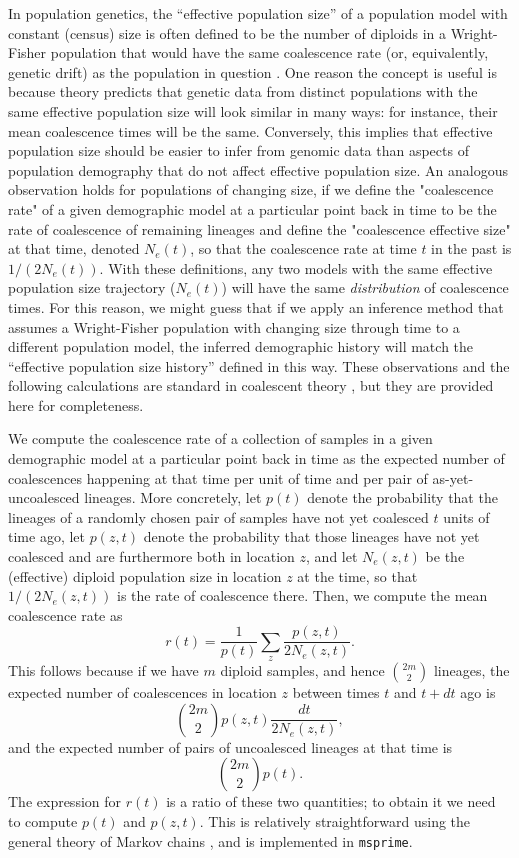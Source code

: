 \documentclass[12pt,halfline,a4paper]{ouparticle}
\begin{document}
In population genetics, the ``effective population size''
of a population model with constant (census) size
is often defined to be the number of diploids in a Wright-Fisher population
that would have the same coalescence rate (or, equivalently, genetic drift)
as the population in question \citep[reviewed in][]{crow1988inbreeding}.
One reason the concept is useful
is because theory predicts that genetic data from distinct populations
with the same effective population size will look similar in many ways:
for instance, their mean coalescence times will be the same.
Conversely, this implies that effective population size
should be easier to infer from genomic data than aspects of population demography
that do not affect effective population size.
An analogous observation holds for populations of changing size,
if we define the "coalescence rate" of a given demographic model
at a particular point back in time
to be the rate of coalescence of remaining lineages
and define the "coalescence effective size" at that time,
denoted $N_e(t)$, so that the coalescence rate at time $t$ in the past
is $1/(2N_e(t))$.
With these definitions, any two models with the same effective population size trajectory ($N_e(t)$)
will have the same \emph{distribution} of coalescence times.
For this reason,
we might guess that if we apply an inference method
that assumes a Wright-Fisher population with changing size through time
to a different population model,
the inferred demographic history will match the ``effective population size history''
defined in this way.
These observations and the following calculations are standard in coalescent theory
\citep[see e.g.,][]{wakeley2005coalescent},
but they are provided here for completeness.

We compute the coalescence rate of a collection of samples in a given demographic model
at a particular point back in time
as the expected number of coalescences happening at that time
per unit of time and per pair of as-yet-uncoalesced lineages.
More concretely,
let $p(t)$ denote the probability that the lineages of a randomly chosen pair of samples
have not yet coalesced $t$ units of time ago,
let $p(z, t)$ denote the probability that those lineages have not yet coalesced
and are furthermore both in location $z$,
and let $N_e(z,t)$ be the (effective) diploid population size in location $z$ at the time,
so that $1/(2 N_e(z,t))$ is the rate of coalescence there.
Then, we compute the mean coalescence rate as
$$  r(t)  = \frac{1}{p(t)} \sum_z \frac{p(z,t)}{2N_e(z,t)} . $$
This follows because if we have $m$ diploid samples, and hence $\binom{2m}{2}$ lineages,
the expected number of coalescences in location $z$ between times $t$ and $t+dt$ ago is
$$
\binom{2m}{2} p(z,t) \frac{ dt }{ 2 N_e(z,t) },
$$
and the expected number of pairs of uncoalesced lineages at that time is
$$
\binom{2m}{2} p(t) .
$$
The expression for $r(t)$ is a ratio of these two quantities;
to obtain it we need to compute $p(t)$ and $p(z,t)$.
This is relatively straightforward
using the general theory of Markov chains \citep[e.g,.][]{kemeny2012denumerable},
and is implemented in \texttt{msprime}.
\end{document}
